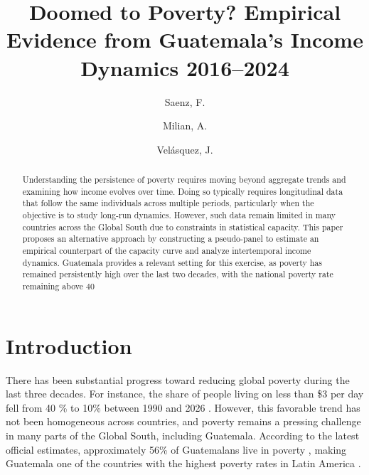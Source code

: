 \documentclass{article}
\title{Doomed to Poverty? Empirical Evidence from Guatemala's Income Dynamics 2016–2024}
\author[1]{Saenz, F.}
\author[2]{Milian, A.}
\author[2]{Velásquez, J.}
\affil[1]{J-PAL LAC, Guatemala City}
\affil[2]{Universidad Rafael Landívar, Guatemala City}
\date{}
\begin{document}
\doublespacing
\maketitle

\begin{abstract}
Understanding the persistence of poverty requires moving beyond aggregate trends and examining how income evolves over time. Doing so typically requires longitudinal data that follow the same individuals across multiple periods, particularly when the objective is to study long-run dynamics. However, such data remain limited in many countries across the Global South due to constraints in statistical capacity. This paper proposes an alternative approach by constructing a pseudo-panel to estimate an empirical counterpart of the capacity curve and analyze intertemporal income dynamics. Guatemala provides a relevant setting for this exercise, as poverty has remained persistently high over the last two decades, with the national poverty rate remaining above 40%

\end{abstract}

\newpage

\section{Introduction}
There has been substantial progress toward reducing global poverty during the last three decades. For instance, the share of people living on less than \$3 per day fell from 40 \% to 10\% between 1990 and 2026 \parencite{worldbank2026poverty}. However, this favorable trend has not been homogeneous across countries, and poverty remains a pressing challenge in many parts of the Global South, including Guatemala. According to the latest official estimates, approximately 56\% of Guatemalans live in poverty \parencite{ine2024encovi, mides2024ipm}, making Guatemala one of the countries with the highest poverty rates in Latin America \parencite{worldbank2026guatemala}. 
\end{document}
